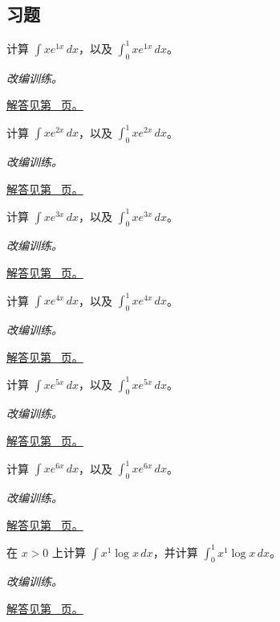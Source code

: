 \documentclass[12pt,fontset=fandol]{ctexart}
\begin{document}
\subsection{习题}
\begin{example}[一次多项式乘指数]\label{ex:c13q1}
计算 $\displaystyle\int xe^{1x}\,dx$，以及 $\displaystyle\int_0^1xe^{1x}\,dx$。
\par\textit{改编训练。}\par\hyperref[ans:c13q1]{解答见第~\pageref{ans:c13q1} 页。}
\end{example}
\begin{example}[一次多项式乘指数]\label{ex:c13q2}
计算 $\displaystyle\int xe^{2x}\,dx$，以及 $\displaystyle\int_0^1xe^{2x}\,dx$。
\par\textit{改编训练。}\par\hyperref[ans:c13q2]{解答见第~\pageref{ans:c13q2} 页。}
\end{example}
\begin{example}[一次多项式乘指数]\label{ex:c13q3}
计算 $\displaystyle\int xe^{3x}\,dx$，以及 $\displaystyle\int_0^1xe^{3x}\,dx$。
\par\textit{改编训练。}\par\hyperref[ans:c13q3]{解答见第~\pageref{ans:c13q3} 页。}
\end{example}
\begin{example}[一次多项式乘指数]\label{ex:c13q4}
计算 $\displaystyle\int xe^{4x}\,dx$，以及 $\displaystyle\int_0^1xe^{4x}\,dx$。
\par\textit{改编训练。}\par\hyperref[ans:c13q4]{解答见第~\pageref{ans:c13q4} 页。}
\end{example}
\begin{example}[一次多项式乘指数]\label{ex:c13q5}
计算 $\displaystyle\int xe^{5x}\,dx$，以及 $\displaystyle\int_0^1xe^{5x}\,dx$。
\par\textit{改编训练。}\par\hyperref[ans:c13q5]{解答见第~\pageref{ans:c13q5} 页。}
\end{example}
\begin{example}[一次多项式乘指数]\label{ex:c13q6}
计算 $\displaystyle\int xe^{6x}\,dx$，以及 $\displaystyle\int_0^1xe^{6x}\,dx$。
\par\textit{改编训练。}\par\hyperref[ans:c13q6]{解答见第~\pageref{ans:c13q6} 页。}
\end{example}
\begin{example}[幂函数乘对数]\label{ex:c13q7}
在 $x>0$ 上计算 $\displaystyle\int x^{1}\log x\,dx$，并计算 $\displaystyle\int_0^1x^{1}\log x\,dx$。
\par\textit{改编训练。}\par\hyperref[ans:c13q7]{解答见第~\pageref{ans:c13q7} 页。}
\end{example}
\end{document}
